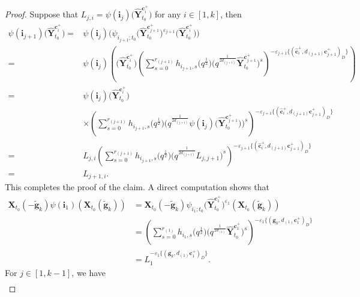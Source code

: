 \begin{proof}
 Suppose that $L_{j,i}=\psi(\mathbf{i}_{j})\bigl(\mathbf{\hat{Y}}_{t_{0}}^{\mathbf{c}_{i}^{+}}\bigr)$ for any $i\in[1,k]$, then
 \begin{align*}
 \psi(\mathbf{i}_{j+1})\bigl(\mathbf{\hat{Y}}_{t_{0}}^{\mathbf{c}_{i}^{+}}\bigr)
 ={}&\psi(\mathbf{i}_{j})\bigl(\psi_{i_{j+1};t_{0}}\bigl(\mathbf{\hat{Y}}_{t_{0}}^{\mathbf{c}_{j+1}^{+}}\bigr)^{\varepsilon_{j+1}}\bigl(\mathbf{\hat{Y}}_{t_{0}}^{\mathbf{c}_{i}^{+}}\bigr)\bigr)\\
 ={}&\psi(\mathbf{i}_{j})\left(\bigl(\mathbf{\hat{Y}}_{t_{0}}^{\mathbf{c}_{i}^{+}}\bigr)\left(\sum\limits^{r_{(j+1)}}_{s=0}h_{i_{j+1},s}
 \bigl(q^{\frac{1}{2}}\bigr)\bigl(q^{\frac{1}{2d_{(j+1)}}}\mathbf{\hat{Y}}_{t_{0}}^{\mathbf{c}_{j+1}^{+}}\bigr)^{s}\right)^{-\varepsilon_{j+1}
 \{(\mathbf{\hat{c}}_{i}^{+},d_{(j+1)}\mathbf{c}_{j+1}^{+})_{D}\}}\right)\\
 ={}&\psi(\mathbf{i}_{j})\bigl(\mathbf{\hat{Y}}_{t_{0}}^{\mathbf{c}_{i}^{+}}\bigr)\\
 &\times\left(\sum\limits^{r_{(j+1)}}_{s=0}h_{i_{j+1},s}\bigl(q^{\frac{1}{2}}\bigr)
 \bigl(q^{\frac{1}{2d_{(j+1)}}}\psi(\mathbf{i}_{j})\bigl(\mathbf{\hat{Y}}_{t_{0}}^{\mathbf{c}_{j+1}^{+}}\bigr)\bigr)^{s}\right)^{-\varepsilon_{j+1}\{(\mathbf{\hat{c}}_{i}^{+},d_{(j+1)}\mathbf{c}_{j+1}^{+})_{D}\}}\\
 ={}&L_{j,i}\left(\sum\limits^{r_{(j+1)}}_{s=0}h_{i_{j+1},s}\bigl(q^{\frac{1}{2}}\bigr)\bigl(q^{\frac{1}{2d_{(j+1)}}}L_{j,j+1}\bigr)^{s}\right)^{-\varepsilon_{j+1}
 \{(\mathbf{\hat{c}}_{i}^{+},d_{(j+1)}\mathbf{c}_{j+1}^{+})_{D}\}}\\
 ={}&L_{j+1,i}.
 \end{align*}
 This completes the proof of the claim.
 A direct computation shows that
 \begin{align*}
 \mathbf{X}_{t_0}(-\mathbf{\tilde{g}}_{k})\psi(\mathbf{i}_{1})(\mathbf{X}_{t_0}(\mathbf{\tilde{g}}_{k}))
 &=\mathbf{X}_{t_0}(-\mathbf{\tilde{g}}_{k})\psi_{i_{1};t_{0}}\bigl(\mathbf{\hat{Y}}_{t_{0}}^{\mathbf{c}_{1}^{+}}\bigr)^{\varepsilon_{1}}(\mathbf{X}_{t_0}(\mathbf{\tilde{g}}_{k}))\\
 &=\left(\sum\limits^{r_{(1)}}_{s=0}h_{i_{1},s}\bigl(q^{\frac{1}{2}}\bigr)\bigl(q^{\frac{1}{2d_{(1)}}}\mathbf{\hat{Y}}_{t_{0}}^{\mathbf{c}_{1}^{+}}\bigr)^{s}\right)^{-\varepsilon_{1}\{(\mathbf{g}_{k},d_{(1)}\mathbf{c}_{1}^{+})_{D}\}}\\
 &=L_{1}^{-\varepsilon_{1}\{(\mathbf{g}_{k},d_{(1)}\mathbf{c}_{1}^{+})_{D}\}}.
 \end{align*}
 For $j\in[1,k-1]$, we have
 \begin{gather*}

\end{gather*}
\end{proof}

